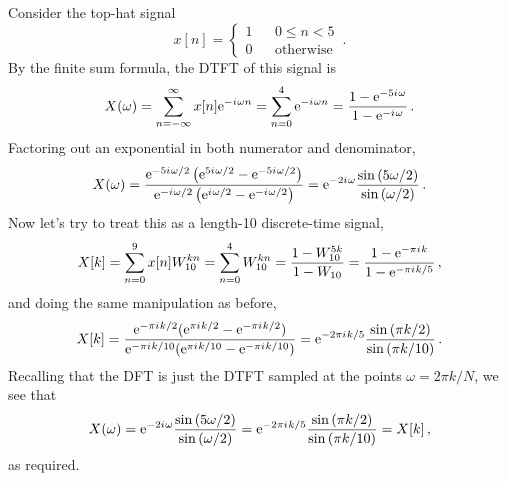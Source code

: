 %
\begin{exmp}
  Consider the top-hat signal
  \begin{displaymath}
    x[n] =
    \left\{\begin{array}{ccl}
    1 & & 0 \leq n < 5 \\
    0 & & \mathrm{otherwise}
    \end{array}\right. \,.
  \end{displaymath}
  By the finite sum formula, the DTFT of this signal is
  \begin{displaymath}
    X(\omega) = \sum_{n=-\infty}^\infty x[n]\mathrm{e}^{-{i\mkern1mu}\omega n}
    = \sum_{n=0}^4\mathrm{e}^{-{i\mkern1mu}\omega n}
    = \frac{1 - \mathrm{e}^{-5{i\mkern1mu}\omega}}{1 - \mathrm{e}^{-{i\mkern1mu}\omega}} \,.
  \end{displaymath}
  Factoring out an exponential in both numerator and denominator,
  \begin{displaymath}
    X(\omega) = \frac{
      \mathrm{e}^{-5{i\mkern1mu}\omega/2}\left(\mathrm{e}^{5{i\mkern1mu}\omega/2} - \mathrm{e}^{-5{i\mkern1mu}\omega/2}\right)
    }{
      \mathrm{e}^{-{i\mkern1mu}\omega/2}\left(\mathrm{e}^{{i\mkern1mu}\omega/2} - \mathrm{e}^{-{i\mkern1mu}\omega/2}\right)
    } = \mathrm{e}^{-2{i\mkern1mu}\omega}\frac{
      \sin\left(5\omega/2\right)
    }{
      \sin\left(\omega/2\right)
    } \,.
  \end{displaymath}
  Now let's try to treat this as a length-10 discrete-time signal,
  \begin{displaymath}
    X[k] = \sum_{n=0}^9 x[n]W_{10}^{kn} = \sum_{n=0}^4 W_{10}^{kn}
    = \frac{1 - W_{10}^{5k}}{1 - W_{10}}
    = \frac{1 - \mathrm{e}^{-\pi{i\mkern1mu} k}}{1 - \mathrm{e}^{-\pi{i\mkern1mu} k/5}} \,,
  \end{displaymath}
  and doing the same manipulation as before,
  \begin{displaymath}
    X[k] = \frac{
      \mathrm{e}^{-\pi{i\mkern1mu} k/2}(\mathrm{e}^{\pi{i\mkern1mu} k/2} - \mathrm{e}^{-\pi{i\mkern1mu} k/2}) 
    }{
      \mathrm{e}^{-\pi{i\mkern1mu} k/10}(\mathrm{e}^{\pi{i\mkern1mu} k/10} - \mathrm{e}^{-\pi{i\mkern1mu} k/10}) 
    } = \mathrm{e}^{-2\pi{i\mkern1mu} k / 5} \frac{
      \sin\left(\pi k/2\right)
    }{
      \sin\left(\pi k/10\right)
    } \,.
  \end{displaymath}
  Recalling that the DFT is just the DTFT sampled at the points
  $\omega = 2\pi k/N$, we see that
  \begin{displaymath}
    X(\omega) = \mathrm{e}^{-2{i\mkern1mu}\omega}\frac{
      \sin\left(5\omega/2\right)
    }{
      \sin\left(\omega/2\right)
    } =
    \mathrm{e}^{-2\pi{i\mkern1mu} k / 5}\frac{
      \sin\left(\pi k/2\right)
    }{
      \sin\left(\pi k/10\right)
    } = X[k] \,,
  \end{displaymath}
  as required.
\end{exmp}

